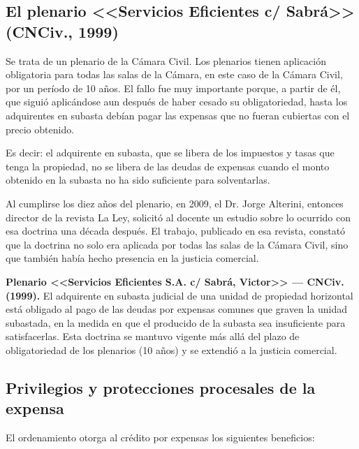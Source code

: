 \documentclass[12pt,oneside]{book}
\begin{document}
\subsection{El plenario <<Servicios Eficientes c/ Sabrá>> (CNCiv., 1999)}

Se trata de un plenario de la Cámara Civil. Los plenarios tienen aplicación obligatoria para todas las salas de la Cámara, en este caso de la Cámara Civil, por un período de 10 años. El fallo fue muy importante porque, a partir de él, que siguió aplicándose aun después de haber cesado su obligatoriedad, hasta los adquirentes en subasta debían pagar las expensas que no fueran cubiertas con el precio obtenido. %

Es decir: el adquirente en subasta, que se libera de los impuestos y tasas que tenga la propiedad, no se libera de las deudas de expensas cuando el monto obtenido en la subasta no ha sido suficiente para solventarlas.

Al cumplirse los diez años del plenario, en 2009, el Dr. Jorge Alterini, entonces director de la revista La Ley, solicitó al docente un estudio sobre lo ocurrido con esa doctrina una década después. El trabajo, publicado en esa revista, constató que la doctrina no solo era aplicada por todas las salas de la Cámara Civil, sino que también había hecho presencia en la justicia comercial.

\begin{important}
\textbf{Plenario <<Servicios Eficientes S.A. c/ Sabrá, Victor>> --- CNCiv. (1999).} El adquirente en subasta judicial de una unidad de propiedad horizontal está obligado al pago de las deudas por expensas comunes que graven la unidad subastada, en la medida en que el producido de la subasta sea insuficiente para satisfacerlas. Esta doctrina se mantuvo vigente más allá del plazo de obligatoriedad de los plenarios (10 años) y se extendió a la justicia comercial.
\end{important}

\subsection{Privilegios y protecciones procesales de la expensa}

El ordenamiento otorga al crédito por expensas los siguientes beneficios:
\end{document}

